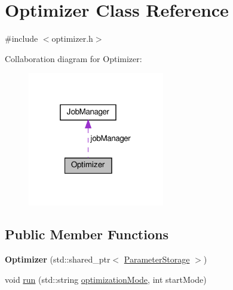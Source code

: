\hypertarget{classOptimizer}{}\section{Optimizer Class Reference}
\label{classOptimizer}


{\ttfamily \#include $<$optimizer.\+h$>$}



Collaboration diagram for Optimizer\+:\nopagebreak
\begin{figure}[H]
\begin{center}
\leavevmode
\includegraphics[width=169pt]{classOptimizer__coll__graph}
\end{center}
\end{figure}
\subsection*{Public Member Functions}
\begin{DoxyCompactItemize}
\item 
\mbox{\label{classOptimizer_a60755ddbe7164fbee43ed25399613b9e}} 
{\bfseries Optimizer} (std\+::shared\+\_\+ptr$<$ \hyperlink{classParameterStorage}{Parameter\+Storage} $>$)
\item 
void \hyperlink{classOptimizer_aa9fdb7cd911fdd9fbfaf3fc8d86ea408}{run} (std\+::string \hyperlink{classOptimizer_aba4673e21bc48603b1acd38cfb01b422}{optimization\+Mode}, int start\+Mode)
\end{DoxyCompactItemize}
